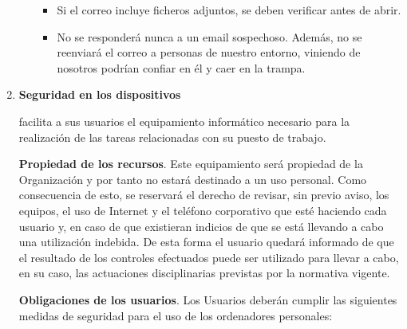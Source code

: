 \begin{enumerate}[label=\alph*)]
\begin{itemize}
\begin{itemize}
        \item Si el correo incluye ficheros adjuntos, se deben verificar antes de abrir.
        \item No se responderá nunca a un email sospechoso. Además, no se reenviará el correo a personas de nuestro entorno, viniendo de nosotros podrían confiar en él y caer en la trampa.
    \end{itemize}
\end{itemize}

\item \textbf{Seguridad en los dispositivos}

\Beneficiario{} facilita a sus usuarios el equipamiento informático necesario para la realización de las tareas relacionadas con su puesto de trabajo.

\textbf{Propiedad de los recursos}. Este equipamiento será propiedad de la Organización y por tanto no estará destinado a un uso personal. Como consecuencia de esto, \Beneficiario{} se reservará el derecho de revisar, sin previo aviso, los equipos, el uso de Internet y el teléfono corporativo que esté haciendo cada usuario y, en caso de que existieran indicios de que se está llevando a cabo una utilización indebida. De esta forma el usuario quedará informado de que el resultado de los controles efectuados puede ser utilizado para llevar a cabo, en su caso, las actuaciones disciplinarias previstas por la normativa vigente.

\textbf{Obligaciones de los usuarios}. Los Usuarios deberán cumplir las siguientes medidas de seguridad para el uso de los ordenadores personales:


\end{enumerate}
